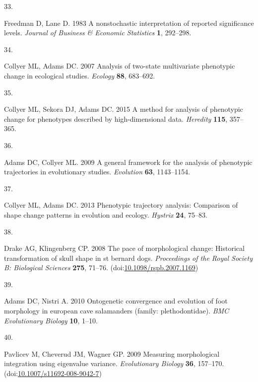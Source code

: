 \documentclass[
  11pt,
]{article}
\newlength{\cslhangindent}
\newlength{\csllabelwidth}
\newlength{\cslentryspacingunit} %
\newenvironment{CSLReferences}[2] %
 {%
  \setlength{\parindent}{0pt}
  \ifodd #1
  \let\oldpar\par
  \def\par{\hangindent=\cslhangindent\oldpar}
  \fi
  \setlength{\parskip}{#2\cslentryspacingunit}
 }%
 {}
\newcommand{\CSLLeftMargin}[1]{\parbox[t]{\csllabelwidth}{#1}}
\newcommand{\CSLRightInline}[1]{\parbox[t]{\linewidth - \csllabelwidth}{#1}\break}
\begin{document}
\begin{CSLReferences}{0}{0}
\leavevmode{}%
\CSLLeftMargin{33. }%
\CSLRightInline{Freedman D, Lane D. 1983 A nonstochastic interpretation
of reported significance levels. \emph{Journal of Business {\&} Economic
Statistics} \textbf{1}, 292--298.}

\leavevmode{}%
\CSLLeftMargin{34. }%
\CSLRightInline{Collyer ML, Adams DC. 2007 Analysis of two-state
multivariate phenotypic change in ecological studies. \emph{Ecology}
\textbf{88}, 683--692.}

\leavevmode{}%
\CSLLeftMargin{35. }%
\CSLRightInline{Collyer ML, Sekora DJ, Adams DC. 2015 A method for
analysis of phenotypic change for phenotypes described by
high-dimensional data. \emph{Heredity} \textbf{115}, 357--365.}

\leavevmode{}%
\CSLLeftMargin{36. }%
\CSLRightInline{Adams DC, Collyer ML. 2009 A general framework for the
analysis of phenotypic trajectories in evolutionary studies.
\emph{Evolution} \textbf{63}, 1143--1154.}

\leavevmode{}%
\CSLLeftMargin{37. }%
\CSLRightInline{Collyer ML, Adams DC. 2013 Phenotypic trajectory
analysis: Comparison of shape change patterns in evolution and ecology.
\emph{Hystrix} \textbf{24}, 75--83.}

\leavevmode{}%
\CSLLeftMargin{38. }%
\CSLRightInline{Drake AG, Klingenberg CP. 2008 The pace of morphological
change: Historical transformation of skull shape in st bernard dogs.
\emph{Proceedings of the Royal Society B: Biological Sciences}
\textbf{275}, 71--76.
(doi:\href{https://doi.org/10.1098/rspb.2007.1169}{10.1098/rspb.2007.1169})}

\leavevmode{}%
\CSLLeftMargin{39. }%
\CSLRightInline{Adams DC, Nistri A. 2010 Ontogenetic convergence and
evolution of foot morphology in european cave salamanders (family:
plethodontidae). \emph{BMC Evolutionary Biology} \textbf{10}, 1--10.}

\leavevmode{}%
\CSLLeftMargin{40. }%
\CSLRightInline{Pavlicev M, Cheverud JM, Wagner GP. 2009 Measuring
morphological integration using eigenvalue variance. \emph{Evolutionary
Biology} \textbf{36}, 157--170.
(doi:\href{https://doi.org/10.1007/s11692-008-9042-7}{10.1007/s11692-008-9042-7})}


\end{CSLReferences}
\end{document}
